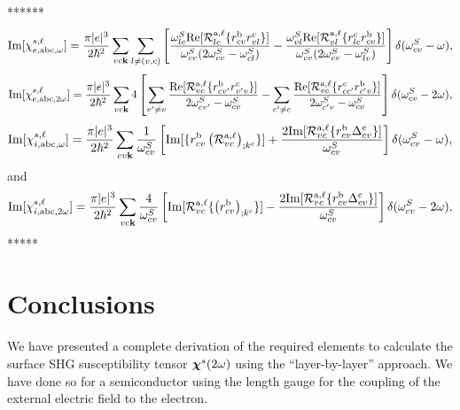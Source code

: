\documentclass[floatfix,prb,aps,superscriptaddress,11pt,preprint]{revtex4}
\begin{document}
******
\begin{equation}\label{imchiewn}
\mathrm{Im}[\chi_{e,\mathrm{a}\mathrm{b}\mathrm{c},\omega}^{s,\ell}]
=
\frac{\pi |e|^3}{2\hbar^2} 
\sum_{vc\mathbf{k}}
\sum_{l\neq(v,c)}
\left[
\frac{\omega^S_{lc}\mathrm{Re}[{\cal R}^{\mathrm{a},\ell}_{lc}\{r^{\mathrm{b}}_{cv}r^{\mathrm{c}}_{vl}\}]}
{\omega^S_{cv}(2\omega^S_{cv}-\omega^S_{cl})}
-
\frac{\omega^S_{vl}\mathrm{Re}[{\cal R}^{\mathrm{a},\ell}_{vl}\{r^{\mathrm{c}}_{lc}r^{\mathrm{b}}_{cv}\}]}
{\omega^S_{cv}(2\omega^S_{cv}-\omega^S_{lv})}
\right]
\delta(\omega^S_{cv}-\omega)
,
\end{equation}  
\begin{equation}\label{imchie2wn}
\mathrm{Im}[\chi_{e,\mathrm{a}\mathrm{b}\mathrm{c},2\omega}^{s,\ell}]
=
\frac{\pi |e|^3}{2\hbar^2} 
\sum_{vc\mathbf{k}}
4
\left[
\sum_{v'\ne v}
\frac{\mathrm{Re}[{\cal
    R}^{\mathrm{a},\ell}_{vc}\{r^{\mathrm{b}}_{cv'}r^{\mathrm{c}}_{v'v}\}]}{2\omega^S_{cv'}-\omega^S_{cv}}
-
\sum_{c'\ne c}
\frac{\mathrm{Re}[{\cal R}^{\mathrm{a},\ell}_{vc}\{r^{\mathrm{c}}_{cc'}r^{\mathrm{b}}_{c'v}\}]}
{2\omega^S_{c'v}-\omega^S_{cv}}
\right]
\delta(\omega^S_{cv}-2\omega)
,
\end{equation}
\begin{equation}\label{imchiwn}
\mathrm{Im}[\chi_{i,\mathrm{a}\mathrm{b}\mathrm{c},\omega}^{s,\ell}]
=
\frac{\pi|e|^3}{2\hbar^2}
\sum_{cv\mathbf{k}}
\frac{1}{\omega^S_{cv}}
\left[
\mathrm{Im}[\{r^{\mathrm{b}}_{cv}\left({\cal R}^{\mathrm{a},\ell}_{vc}\right)_{;k^{\mathrm{c}}}\}]
+
\frac{2\mathrm{Im}[{\cal R}^{\mathrm{a},\ell}_{vc}\{r^{\mathrm{b}}_{cv}\Delta^{\mathrm{c}}_{cv}\}]}{\omega^S_{cv}}
\right]
\delta(\omega^S_{cv}-\omega)
,
\end{equation}
and
\begin{equation}\label{imchi2wn}
\mathrm{Im}[\chi_{i,\mathrm{a}\mathrm{b}\mathrm{c},2\omega}^{s,\ell}]
=
\frac{\pi|e|^3}{2\hbar^2}\sum_{vc\mathbf{k}}
\frac{4}{\omega^S_{cv}}
\left[
\mathrm{Im}[{\cal R}^{\mathrm{a},\ell}_{vc}\{\left(r^{\mathrm{b}}_{cv}\right)_{;k^{\mathrm{c}}}\}]
-
\frac{2\mathrm{Im}[{\cal R}^{\mathrm{a},\ell}_{vc}\{r^{\mathrm{b}}_{cv}\Delta^{\mathrm{c}}_{cv}\}]}{\omega^S_{cv}}
\right]\delta(\omega^S_{cv}-2\omega)
,
\end{equation}
*****




\section{Conclusions}\label{con}

We have presented a complete derivation of the required elements to
calculate the surface SHG susceptibility tensor $\boldsymbol{\chi}^s(2\omega)$ 
using the ``layer-by-layer'' approach. We have done so for a
semiconductor using the 
length gauge for the coupling of the external electric field to the electron. 
\end{document}
